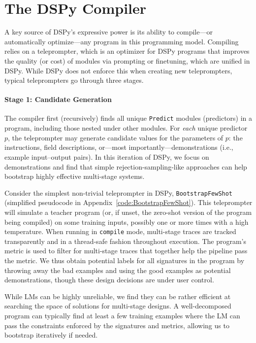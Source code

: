 \section{The DSPy Compiler}\label{sec:compiler}

A key source of DSPy's expressive power is its ability to compile---or automatically optimize---any program in this programming model. Compiling relies on a teleprompter, which is an optimizer for DSPy programs that improves the quality (or cost) of modules via prompting or finetuning, which are unified in DSPy. %
While DSPy does not enforce this when creating new teleprompters, typical teleprompters go through three stages. 


\paragraph{Stage 1: Candidate Generation}\label{sec:teleprompter:optimizations}

The compiler first (recursively) finds all unique \texttt{Predict} modules (predictors) in a program, including those nested under other modules. For \textit{each} unique predictor $p$, the teleprompter may generate candidate values for the parameters of $p$: the instructions, field descriptions, or---most importantly---demonstrations (i.e., example input--output pairs). In this iteration of DSPy, we focus on demonstrations and find that simple rejection-sampling-like approaches can help bootstrap highly effective multi-stage systems.

Consider the simplest non-trivial teleprompter in DSPy, \texttt{BootstrapFewShot} (simplified pseudocode in {Appendix~\ref{code:BootstrapFewShot}}). This teleprompter will simulate a teacher program (or, if unset, the zero-shot version of the program being compiled) on some training inputs, possibly one or more times with a high temperature. When running in \texttt{compile} mode, multi-stage traces are tracked transparently and in a thread-safe fashion throughout execution. The program's metric is used to filter for multi-stage traces that together help the pipeline pass the metric. We thus obtain potential labels for all signatures in the program by throwing away the bad examples and using the good examples as potential demonstrations, though these design decisions are under user control.

While LMs can be highly unreliable, we find they can be rather efficient at searching the space of solutions for multi-stage designs. A well-decomposed program can typically find at least a few training examples where the LM can pass the constraints enforced by the signatures and metrics, allowing us to bootstrap iteratively if needed. 


